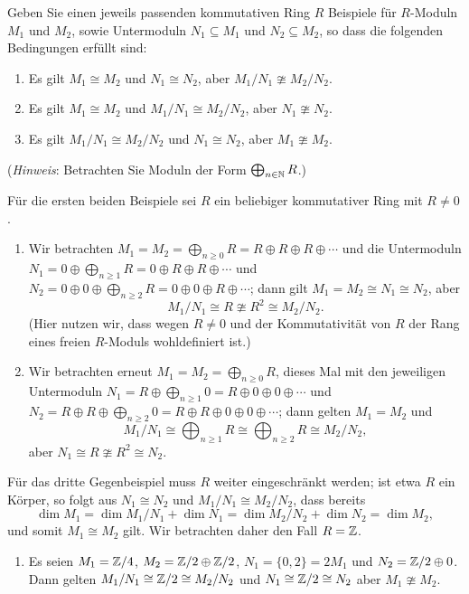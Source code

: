 \begin{question}[subtitle = Kürzungsregeln bis auf Isomorphie]
  \label{question: cancelation laws up to isomorphism}
  Geben Sie einen jeweils passenden kommutativen Ring $R$ Beispiele für $R$-Moduln $M_1$ und $M_2$, sowie Untermoduln $N_1 \subseteq M_1$ und $N_2 \subseteq M_2$, so dass die folgenden Bedingungen erfüllt sind:
  \begin{enumerate}
    \item
      Es gilt $M_1 \cong M_2$ und $N_1 \cong N_2$, aber $M_1/N_1 \ncong M_2/N_2$.
    \item
      Es gilt $M_1 \cong M_2$ und $M_1/N_1 \cong M_2/N_2$, aber $N_1 \ncong N_2$.
    \item
      Es gilt $M_1/N_1 \cong M_2/N_2$ und $N_1 \cong N_2$, aber $M_1 \ncong M_2$.
  \end{enumerate}
  (\emph{Hinweis}:
   Betrachten Sie Moduln der Form $\bigoplus_{n \in \mathbb{N}} R$.)
\end{question}


\begin{solution}
  Für die ersten beiden Beispiele sei $R$ ein beliebiger kommutativer Ring mit $R \neq 0$.
  \begin{enumerate}
    \item
      Wir betrachten $M_1 = M_2 = \bigoplus_{n \geq 0} R = R \oplus R \oplus R \oplus \dotsb$ und die Untermoduln $N_1 = 0 \oplus \bigoplus_{n \geq 1} R = 0 \oplus R \oplus R \oplus \dotsb$ und $N_2 = 0 \oplus 0 \oplus \bigoplus_{n \geq 2} R = 0 \oplus 0 \oplus R \oplus \dotsb$;
      dann gilt $M_1 = M_2 \cong N_1 \cong N_2$, aber
      \[
        M_1/N_1 \cong R \ncong R^2 \cong M_2/N_2.
      \]
      (Hier nutzen wir, dass wegen $R \neq 0$ und der Kommutativität von $R$ der Rang eines freien $R$-Moduls wohldefiniert ist.)
    
    \item
      Wir betrachten erneut $M_1 = M_2 = \bigoplus_{n \geq 0} R$, dieses Mal mit den jeweiligen Untermoduln $N_1 = R \oplus \bigoplus_{n \geq 1} 0 = R \oplus 0 \oplus 0 \oplus \dotsb$ und $N_2 = R \oplus R \oplus \bigoplus_{n \geq 2} 0 = R \oplus R \oplus 0 \oplus 0 \oplus \dotsb$;
      dann gelten $M_1 = M_2$ und
      \[
              M_1/N_1
        \cong \bigoplus_{n \geq 1} R
        \cong \bigoplus_{n \geq 2} R
        \cong M_2/N_2,
      \]
      aber $N_1 \cong R \ncong R^2 \cong N_2$.
  \end{enumerate}
  Für das dritte Gegenbeispiel muss $R$ weiter eingeschränkt werden;
  ist etwa $R$ ein Körper, so folgt aus $N_1 \cong N_2$ und $M_1/N_1 \cong M_2/N_2$, dass bereits
  \[
    \dim M_1 = \dim M_1/N_1 + \dim N_1 = \dim M_2/N_2 + \dim N_2 = \dim M_2,
  \]
  und somit $M_1 \cong M_2$ gilt.
  Wir betrachten daher den Fall $R = \mathbb{Z}$.
  \begin{enumerate}[resume]
    \item
      Es seien $M_1 = \mathbb{Z}/4$, $M_2 = \mathbb{Z}/2 \oplus \mathbb{Z}/2$, $N_1 = \{0,2\} = 2 M_1$ und $N_2 = \mathbb{Z}/2 \oplus 0$.
      Dann gelten $M_1/N_1 \cong \mathbb{Z}/2 \cong M_2/N_2$ und $N_1 \cong \mathbb{Z}/2 \cong N_2$ aber $M_1 \ncong M_2$.
  \end{enumerate}
\end{solution}


